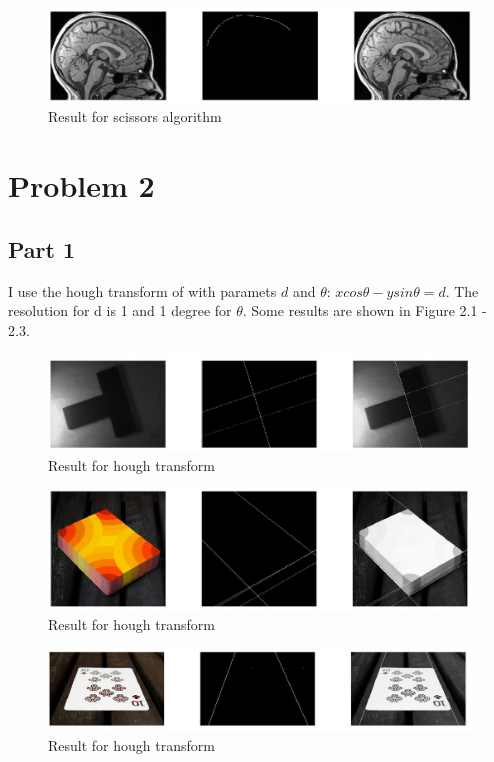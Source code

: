 \documentclass[paper=a4, fontsize=11pt]{scrartcl} %
\numberwithin{equation}{section} %
\numberwithin{figure}{section} %
\numberwithin{table}{subsection} %
\begin{document}
\begin{figure}[!htbp]
	\centering
	\includegraphics[width = 16cm]{p1_2.jpg}
	\caption{Result for scissors algorithm}
\end{figure}



\newpage

\section{Problem 2}

\subsection{Part 1}

I use the hough transform of with paramets $d$ and $\theta$:  $xcos\theta - ysin\theta = d$.
The resolution for d is 1 and 1 degree for $\theta$.
Some results are shown in Figure 2.1 - 2.3.

\begin{figure}[!htbp]
	\centering
	\includegraphics[width = 16cm]{p2_1.jpg}
	\caption{Result for hough transform}
\end{figure}
\begin{figure}[!htbp]
	\centering
	\includegraphics[width = 16cm]{p2_2.jpg}
	\caption{Result for hough transform}
\end{figure}
\begin{figure}[!htbp]
	\centering
	\includegraphics[width = 16cm]{p2_3.jpg}
	\caption{Result for hough transform}
\end{figure}
\end{document}
